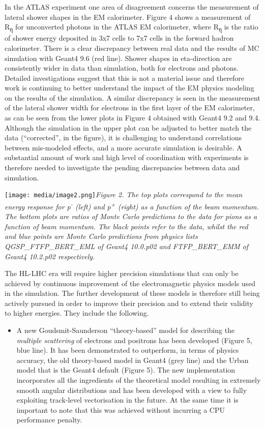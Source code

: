 \documentclass[12pt,a4paper]{article}
\begin{document}
In the ATLAS experiment one area of disagreement concerns the
measurement of lateral shower shapes in the EM calorimeter. Figure 4
shows a measurement of R\textsubscript{η} for unconverted photons in the
ATLAS EM calorimeter, where R\textsubscript{η} is the ratio of shower
energy deposited in 3x7 cells to 7x7 cells in the forward hadron
calorimeter. There is a clear discrepancy between real data and the
results of MC simulation with Geant4 9.6 (red line). Shower shapes in
eta-direction are consistently wider in data than simulation, both for
electrons and photons. Detailed investigations suggest that this is not
a material issue and therefore work is continuing to better understand
the impact of the EM physics modeling on the results of the simulation.
A similar discrepancy is seen in the measurement of the lateral shower
width for electrons in the first layer of the EM calorimeter, as can be
seen from the lower plots in Figure 4 obtained with Geant4 9.2 and 9.4.
Although the simulation in the upper plot can be adjusted to better
match the data (``corrected'', in the figure), it is challenging to
understand correlations between mis-modeled effects, and a more accurate
simulation is desirable. A substantial amount of work and high level of
coordination with experiments is therefore needed to investigate the
pending discrepancies between data and simulation.

\texttt{[image: media/image2.png]}\emph{Figure
2. The top plots correspond to the mean energy response for
p\textsuperscript{-} (left) and p\textsuperscript{+} (right) as a
function of the beam momentum. The bottom plots are ratios of Monte
Carlo predictions to the data for pions as a function of beam momentum.
The black points refer to the data, whilst the red and blue points are
Monte Carlo predictions from physics lists QGSP\_FTFP\_BERT\_EML of
Geant4 10.0.p02 and FTFP\_BERT\_EMM of Geant4 10.2.p02 respectively.}

The HL-LHC era will require higher precision simulations that can only
be achieved by continuous improvement of the electromagnetic physics
models used in the simulation. The further development of these models
is therefore still being actively pursued in order to improve their
precision and to extend their validity to higher energies. They include
the following.

\begin{itemize}
\item
  A new Goudsmit-Saunderson ``theory-based'' model for describing the
  \emph{multiple scattering} of electrons and positrons has been
  developed (Figure 5, blue line). It has been demonstrated to
  outperform, in terms of physics accuracy, the old theory-based model
  in Geant4 (grey line) and the Urban model that is the Geant4 default
  (Figure 5). The new implementation incorporates all the ingredients of
  the theoretical model resulting in extremely smooth angular
  distributions and has been developed with a view to fully exploiting
  track-level vectorisation in the future. At the same time it is
  important to note that this was achieved without incurring a CPU
  performance penalty.
\end{itemize}
\end{document}
